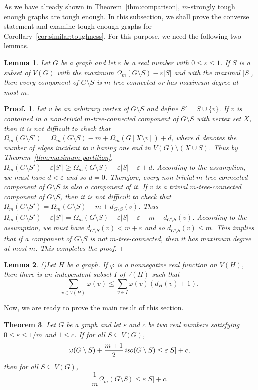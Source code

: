 \documentclass[10pt,bezier]{article}
\newtheorem{prethm}{{\bf Theorem}}[section]
\newenvironment{thm}{\begin{prethm}{\hspace{-0.5
em}{\bf.}}}{\end{prethm}}
\newtheorem{prelem}[prethm]{{\bf Lemma}}
\newenvironment{lem}{\begin{prelem}{\hspace{-0.5
em}{\bf.}}}{\end{prelem}}
\newtheorem{preproof}{{\bf Proof.}}
\newenvironment{proof}[1]{\begin{preproof}{\rm
#1}\hfill{$\Box$}}{\end{preproof}}
\begin{document}
%
As we have already shown in Theorem~\ref{thm:comparison}, $m$-strongly tough enough graphs are tough enough.
%
In this subsection, we shall prove the converse statement and examine
 tough enough graphs for Corollary~\ref{cor:similar:toughness}.
For this purpose, we need the following two lemmas.
%
%
\begin{lem}\label{lem:optimized}
{Let $G$ be a graph and let $\varepsilon$ be a real number with $0 \le \varepsilon \le 1$. If $S$ is a subset of $V(G)$ 
with the maximum $\Omega_m(G\setminus S)-\varepsilon|S|$ and with the maximal $|S|$, 
then every component of $G\setminus S$ is $m$-tree-connected or has maximum degree at most $m$.
}\end{lem}
%
\begin{proof}
{Let $v$ be an arbitrary vertex of $G\setminus S$ and define $S'=S\cup \{v\}$.
If $v$ is contained in a non-trivial $m$-tree-connected component of $G\setminus S$ with vertex set $X$, then 
it is not difficult to check that
$\Omega_m(G\setminus S')=\Omega_m(G\setminus S)-m+\Omega_m(G[X\setminus v])+d$, 
where $d$ denotes the number of edges incident to $v$ having one end in $V(G)\setminus (X\cup S)$.
Thus by Theorem~\ref{thm:maximum-partition},
$\Omega_m(G\setminus S')-\varepsilon|S'|\ge \Omega_m(G\setminus S)-\varepsilon|S| -\varepsilon+d$.
According to the assumption, we must have $d<\varepsilon$ and so $d=0$.
Therefore, every non-trivial $m$-tree-connected component of $G\setminus S$ is also a component of it.
%
If $v$ is a trivial $m$-tree-connected component of $G\setminus S$, then 
it is not difficult to check that
$\Omega_m(G\setminus S') = \Omega_m(G\setminus S)-m+d_{G\setminus S}(v)$.
Thus $\Omega_m(G\setminus S')-\varepsilon|S'|= \Omega_m(G\setminus S)-\varepsilon|S| -\varepsilon-m+d_{G\setminus S}(v)$.
According to the assumption, we must have $d_{G\setminus S}(v)< m+\varepsilon$ and so $d_{G\setminus S}(v)\le m$.
This implies that if a component of $G\setminus S$ is not $m$-tree-connected, then it has maximum degree at most $m$.
This completes the proof.
}\end{proof}
%
%
%
\begin{lem}{\rm (\cite{Isolated})}\label{lem:base:independent-subset}
{Let $H$ be a graph. If $\varphi$ is a nonnegative real function on $V(H)$,
 then there is an independent subset $I$ of $V(H)$ such that 
$$
\sum_{v\in V(H)} \varphi(v)\le \sum_{v\in I}\varphi(v) (d_H(v)+1) .
$$
}\end{lem}
Now, we are ready to prove the main result of this section.
%
\begin{thm}\label{thm:iso:tree-connected}
{Let $G$ be a graph and let $\varepsilon$ and $c$ be two real numbers satisfying $0\le \varepsilon\le 1/m $ and $1 \le c$. 
If for all $S\subseteq V(G)$, 
$$ \omega(G\setminus S)+\small {\frac{m+1}{2}}\, iso(G\setminus S) \le \varepsilon |S|+c,$$
then for all $S\subseteq V(G)$, $$\frac{1}{m} \Omega_m(G\setminus S) \le \varepsilon |S|+c.$$
}\end{thm}
\end{document}
